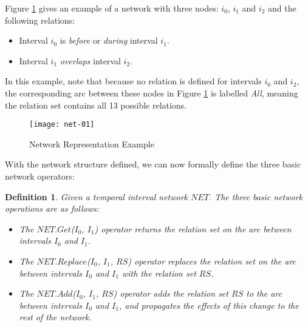 \documentclass[11pt]{report}
\newtheorem{vdefinition}{Definition}[chapter]
\begin{document}
          Figure \ref{figu-tempo-ntwk1} gives an example of a network with
          three nodes: $i_0$, $i_1$ and $i_2$ and the following relations:

          \begin{itemize}
            \item
              Interval ${i_0}$ is {\em before} or {\em during} interval
              ${i_1}$.
            \item
              Interval ${i_1}$ {\em overlaps} interval $i_2$.
          \end{itemize}

          In this example, note that because no relation is defined for
          intervals ${i_0}$ and ${i_2}$, the corresponding arc between these
          nodes in Figure \ref{figu-tempo-ntwk1} is labelled {\em All}, meaning
          the relation set contains all 13 possible relations.

          \begin{figure}[tbhp]
            \begin{center}
              \texttt{[image: net-01]}
              \caption{Network Representation Example}
              \label{figu-tempo-ntwk1}
            \end{center}
          \end{figure}

          With the network structure defined, we can now formally define the
          three basic network operators:

          \begin{vdefinition}
            \label{defn-tempo-oprtn}
            Given a temporal interval network $NET$. The three basic network
            operations are as follows:

            \begin{itemize}
              \item
                The $NET.Get$($I_0$, $I_1$) operator returns the relation
                set on the arc between intervals $I_0$ and $I_1$.
              \item
                The $NET$.$Replace$($I_0$, $I_1$, $RS$) operator replaces the
                relation set on the arc between intervals $I_0$ and $I_1$ with
                the relation set $RS$.
              \item
                The $NET.Add$($I_0$, $I_1$, $RS$) operator adds the relation
                set $RS$ to the arc between intervals $I_0$ and $I_1$, and
                propagates the effects of this change to the rest of the
                network.
            \end{itemize}
          \end{vdefinition}
\end{document}
